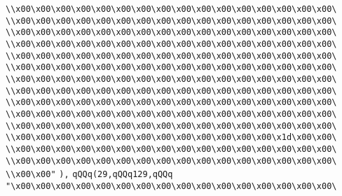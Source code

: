 \verb|\\x00\x00\x00\x00\x00\x00\x00\x00\x00\x00\x00\x00\x00\x00\x00\x00\|\newline
\verb|\\x00\x00\x00\x00\x00\x00\x00\x00\x00\x00\x00\x00\x00\x00\x00\x00\|\newline
\verb|\\x00\x00\x00\x00\x00\x00\x00\x00\x00\x00\x00\x00\x00\x00\x00\x00\|\newline
\verb|\\x00\x00\x00\x00\x00\x00\x00\x00\x00\x00\x00\x00\x00\x00\x00\x00\|\newline
\verb|\\x00\x00\x00\x00\x00\x00\x00\x00\x00\x00\x00\x00\x00\x00\x00\x00\|\newline
\verb|\\x00\x00\x00\x00\x00\x00\x00\x00\x00\x00\x00\x00\x00\x00\x00\x00\|\newline
\verb|\\x00\x00\x00\x00\x00\x00\x00\x00\x00\x00\x00\x00\x00\x00\x00\x00\|\newline
\verb|\\x00\x00\x00\x00\x00\x00\x00\x00\x00\x00\x00\x00\x00\x00\x00\x00\|\newline
\verb|\\x00\x00\x00\x00\x00\x00\x00\x00\x00\x00\x00\x00\x00\x00\x00\x00\|\newline
\verb|\\x00\x00\x00\x00\x00\x00\x00\x00\x00\x00\x00\x00\x00\x00\x00\x00\|\newline
\verb|\\x00\x00\x00\x00\x00\x00\x00\x00\x00\x00\x00\x00\x00\x00\x00\x00\|\newline
\verb|\\x00\x00\x00\x00\x00\x00\x00\x00\x00\x00\x00\x00\x00\x1d\x00\x00\|\newline
\verb|\\x00\x00\x00\x00\x00\x00\x00\x00\x00\x00\x00\x00\x00\x00\x00\x00\|\newline
\verb|\\x00\x00\x00\x00\x00\x00\x00\x00\x00\x00\x00\x00\x00\x00\x00\x00\|\newline
\verb|\\x00\x00"|\newline
\verb|),|\newline
\verb|qQQq(29,qQQq129,qQQq|\newline
\verb|"\x00\x00\x00\x00\x00\x00\x00\x00\x00\x00\x00\x00\x00\x00\x00\x00\|\newline
